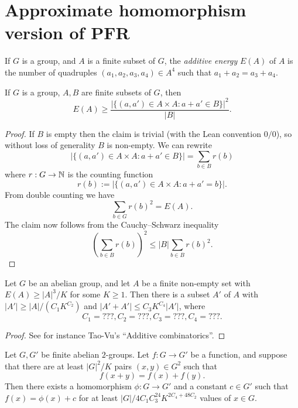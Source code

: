 \chapter{Approximate homomorphism version of PFR}

\begin{definition}\label{energy-def}\leanok  If $G$ is a group, and $A$ is a finite subset of $G$, the \emph{additive energy} $E(A)$ of $A$ is the number of quadruples $(a_1,a_2,a_3,a_4) \in A^4$ such that $a_1+a_2 = a_3+a_4$.
\end{definition}

\begin{lemma}\label{cs-bound}\leanok  If $G$ is a group, $A,B$ are finite subsets of $G$, then
$$ E(A) \geq \frac{|\{ (a,a') \in A \times A: a+a' \in B \}|^2}{|B|}.$$
\end{lemma}

\begin{proof}  If $B$ is empty then the claim is trivial (with the Lean convention $0/0$), so without loss of generality $B$ is non-empty.  We can rewrite
$$ |\{ (a,a') \in A \times A: a+a' \in B \}| = \sum_{b \in B} r(b)$$
where $r: G \to \mathbb{N}$ is the counting function
$$ r(b) := |\{ (a,a') \in A \times A: a+a' = b \}|.$$
From double counting we have
$$ \sum_{b \in G} r(b)^2 = E(A).$$
The claim now follows from the Cauchy--Schwarz inequality
$$ (\sum_{b \in B} r(b))^2 \leq |B| \sum_{b \in B} r(b)^2.$$
\end{proof}

\begin{lemma}\label{bsg} Let $G$ be an abelian group, and let $A$ be a finite non-empty set with $E(A) \geq |A|^3 / K$ for some $K \geq 1$.  Then there is a subset $A'$ of $A$ with $|A'| \geq |A| / (C_1 K^{C_2})$ and $|A'+A'| \leq C_3 K^{C_4} |A'|$, where
$$ C_1 = ???, C_2 = ???, C_3 = ???, C_4 = ???.$$
\end{lemma}

\begin{proof} See for instance Tao-Vu's ``Additive combinatorics''.
\end{proof}

\begin{theorem}\label{approx-hom-pfr} Let $G,G'$ be finite abelian $2$-groups.
  Let $f: G \to G'$ be a function, and suppose that there are at least $|G|^2 / K$ pairs $(x,y) \in G^2$ such that
$$ f(x+y) = f(x) + f(y).$$
Then there exists a homomorphism $\phi: G \to G'$ and a constant $c \in G'$ such that $f(x) = \phi(x)+c$ for at least $|G| / 4C_1 C_3^{24} K^{2C_4+48 C_2}$ values of $x \in G$.
\end{theorem}

